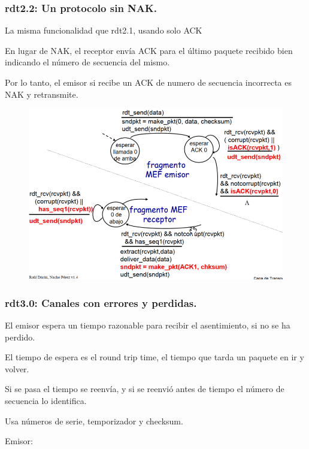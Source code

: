 \documentclass[12pt, twoside, openright]{report} %
\begin{document}
\subsubsection{rdt2.2: Un protocolo sin NAK.}


      La misma funcionalidad que rdt2.1, usando solo ACK

	  En lugar de NAK, el receptor envía ACK para el último paquete
      recibido bien indicando el número de secuencia del mismo.

	  Por lo tanto, el emisor si recibe un ACK de numero de secuencia
      incorrecta es NAK y retransmite.
	  \begin{figure}[H]
		{\includegraphics[scale=.45]{Untitled 14.png}}
	\end{figure}
\subsubsection{rdt3.0: Canales con errores y perdidas.}


      El emisor espera un tiempo razonable para recibir el asentimiento,
      si no se ha perdido.

	  El tiempo de espera es el round trip time, el tiempo que tarda un
      paquete en ir y volver.

	  Si se pasa el tiempo se reenvía, y si se reenvió antes de tiempo
      el número de secuencia lo identifica.

	  Usa números de serie, temporizador y checksum.

	  Emisor:
\end{document}

